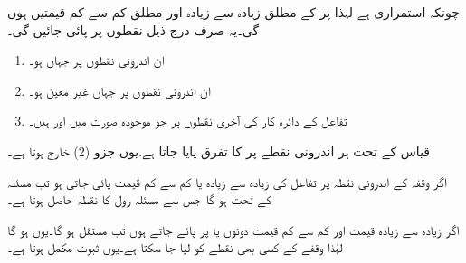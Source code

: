چونکہ  استمراری ہے لہٰذا  پر  کے مطلق زیادہ سے زیادہ اور مطلق کم سے کم قیمتیں ہوں گی۔یہ صرف درج ذیل نقطوں پر پائی جائیں گی۔
\begin{enumerate}[1.]
\item
ان اندرونی نقطوں پر جہاں  ہو۔
\item
ان اندرونی نقطوں پر جہاں  غیر معین ہو۔
\item
تفاعل کے دائرہ کار کی آخری نقطوں پر جو موجودہ صورت میں  اور  ہیں۔
\end{enumerate}
قیاس کے تحت ہر اندرونی نقطے پر  کا تفرق پایا جاتا ہے.یوں جزو (2) خارج ہوتا ہے۔

اگر وقفہ کے اندرونی نقطہ  پر تفاعل کی زیادہ سے زیادہ یا کم سے کم قیمت پائی جاتی ہو تب مسئلہ  کے تحت  ہو گا جس سے مسئلہ رول کا نقطہ حاصل ہوتا ہے۔

اگر زیادہ سے زیادہ قیمت اور کم سے کم قیمت دونوں  یا  پر پائے جاتے ہوں تب  مستقل ہو گا۔یوں  ہو گا لہٰذا وقفے  کے کسی بھی نقطے کو  لیا جا سکتا ہے۔یوں ثبوت مکمل ہوتا ہے۔

